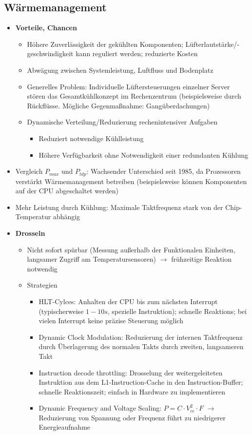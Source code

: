 \subsection{Wärmemanagement}
\begin{itemize}
	\item \textbf{Vorteile, Chancen}
	\begin{itemize}
		\item Höhere Zuverlässigkeit der gekühlten Komponenten; Lüfterlautstärke/-geschwindigkeit kann reguliert werden; reduzierte Kosten
		\item Abwägung zwischen Systemleistung, Luftfluss und Bodenplatz
		\item Generelles Problem: Individuelle Lüftersteuerungen einzelner Server stören das Gesamtkühlkonzept im Rechenzentrum (beispielsweise durch Rückflüsse. Mögliche Gegenmaßnahme: Gangüberdachungen)
		\item Dynamische Verteilung/Reduzierung rechenintensiver Aufgaben
		\begin{itemize}
			\item Reduziert notwendige Kühlleistung
			\item Höhere Verfügbarkeit ohne Notwendigkeit einer redundanten Kühlung
		\end{itemize}
	\end{itemize}
	\item Vergleich \(P_{max}\) und \(P_{tdp}\): Wachsender Unterschied seit 1985, da Prozessoren verstärkt Wärmemanagement betreiben (beispielsweise können Komponenten auf der CPU abgeschaltet werden)
	\item Mehr Leistung durch Kühlung: Maximale Taktfrequenz stark von der Chip-Temperatur abhängig
	\item \textbf{Drosseln}
	\begin{itemize}
		\item Nicht sofort spürbar (Messung außerhalb der Funktionalen Einheiten, langsamer Zugriff am Temperatursensoren) \(\rightarrow\) frühzeitige Reaktion notwendig
		\item Strategien
		\begin{itemize}
			\item HLT-Cylces: Anhalten der CPU bis zum nächsten Interrupt (typischerweise \(1-10s\), spezielle Instruktion); schnelle Reaktions; bei vielen Interrupt keine präzise Steuerung möglich
			\item Dynamic Clock Modulation: Reduzierung der internen Taktfrequenz durch Überlagerung des normalen Takts durch zweiten, langsameren Takt
			\item Instruction decode throttling: Drosselung der weitergeleiteten Instruktion aus dem L1-Instruction-Cache in den Instruction-Buffer; schnelle Reaktionszeit; einfach in Hardware zu implementieren
			\item Dynamic Frequency and Voltage Scaling: \(P=C \cdot V_{cc}^2 \cdot F\) \(\rightarrow\) Reduzierung von Spannung oder Frequenz führt zu niedrigerer Energieaufnahme
		\end{itemize}
	\end{itemize}
\end{itemize}


